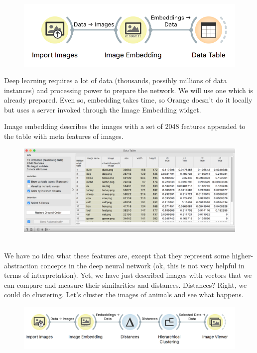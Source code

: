 \begin{figure}
    \includegraphics[scale=0.6]{workflow-embedding.png}
    \label{fig:embedding}
\end{figure}

Deep learning requires a lot of data (thousands, possibly millions of data instances) and processing power to prepare the network. We will use one which is already prepared. Even so, embedding takes time, so Orange doesn't do it locally but uses a server invoked through the Image Embedding widget.

\newpage

Image embedding describes the images with a set of 2048 features appended to the table with meta features of images.

\begin{figure}[h]
    \centering
    \includegraphics[scale=0.45]{data-table.png}
    \caption{$\;$}
\end{figure}

We have no idea what these features are, except that they represent some higher-abstraction concepts in the deep neural network (ok, this is not very helpful in terms of interpretation). Yet, we have just described images with vectors that we can compare and measure their similarities and distances. Distances? Right, we could do clustering. Let's cluster the images of animals and see what happens.

\begin{figure}[h]
    \centering
    \includegraphics[scale=0.6]{workflow-clustering.png}
    \caption{$\;$}
\end{figure}

